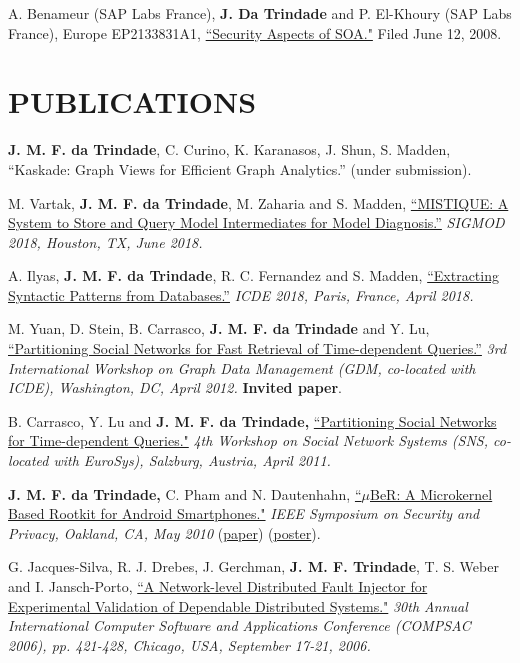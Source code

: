 \documentclass[line,margin]{res}
\begin{document}
\begin{resume}
A. Benameur (SAP Labs France), \textbf{J. Da Trindade} and P. El-Khoury (SAP Labs France), Europe EP2133831A1, \href{http://www.freepatentsonline.com/EP2133831B1.html}{``Security Aspects of SOA."}  Filed June 12, 2008.

\section{PUBLICATIONS}
\textbf{J. M. F. da Trindade}, C. Curino, K. Karanasos, J. Shun, S. Madden, ``Kaskade: Graph Views for Efficient Graph Analytics.'' (under submission).

M. Vartak, \textbf{J. M. F. da Trindade}, M. Zaharia and S. Madden, \href{https://cs.stanford.edu/~matei/papers/2018/sigmod_mistique.pdf}{``MISTIQUE: A System to Store and Query Model Intermediates for Model Diagnosis.''} \textit{SIGMOD 2018, Houston, TX, June 2018.}

A. Ilyas, \textbf{J. M. F. da Trindade}, R. C. Fernandez and S. Madden, \href{https://arxiv.org/pdf/1710.11528.pdf}{``Extracting Syntactic Patterns from Databases.''} \textit{ICDE 2018, Paris, France, April 2018.}

M. Yuan, D. Stein, B. Carrasco, \textbf{J. M. F. da Trindade} and Y. Lu, \href{http://joanatrindade.wdfiles.com/local--files/curriculum/gdm2012-paper.pdf}{``Partitioning Social Networks for Fast Retrieval of Time-dependent Queries.''} \textit{3rd International Workshop on Graph Data Management (GDM, co-located with ICDE), Washington, DC, April 2012.} \textbf{Invited paper}.

B. Carrasco, Y. Lu and \textbf{J. M. F. da Trindade,} \href{http://research.microsoft.com/en-us/projects/ldg/a04-carrasco.pdf}{``Partitioning Social Networks for Time-dependent Queries."} \textit{4th Workshop on Social Network Systems (SNS, co-located with EuroSys), Salzburg, Austria, April 2011.}

\textbf{J. M. F. da Trindade,} C. Pham and N. Dautenhahn, \href{http://joanatrindade.wikidot.com/local--files/curriculum/oakland2010-paper.pdf}{``$\mu$BeR: A Microkernel Based Rootkit for Android Smartphones."} \textit{IEEE Symposium on Security and Privacy, Oakland, CA, May 2010} (\href{http://joanatrindade.wikidot.com/local--files/curriculum/oakland2010-paper.pdf}{paper}) (\href{http://joanatrindade.wikidot.com/local--files/curriculum/oakland2010-poster.pdf}{poster}).

G. Jacques-Silva, R. J. Drebes, J. Gerchman, \textbf{J. M. F. Trindade}, T. S. Weber and I. Jansch-Porto, \href{http://doi.ieeecomputersociety.org/10.1109/COMPSAC.2006.12}{``A Network-level Distributed Fault Injector for Experimental Validation of Dependable Distributed Systems."} \textit{30th Annual International Computer Software and Applications Conference (COMPSAC 2006), pp. 421-428, Chicago, USA, September 17-21, 2006.}


\end{resume}
\end{document}
